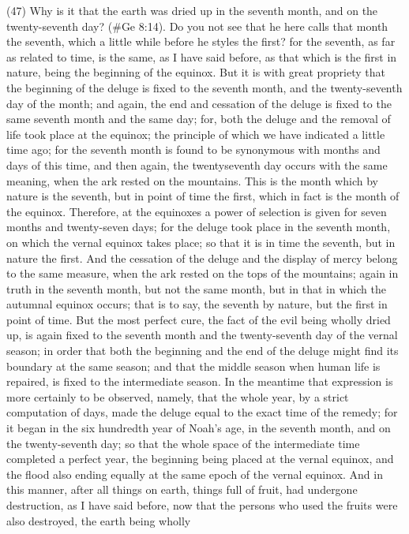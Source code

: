 (47) Why is it that the earth was dried up in the seventh month, and on the twenty-seventh day?
(\#Ge 8:14). Do you not see that he here calls that month the seventh, which a little while before
he styles the first? for the seventh, as far as related to time, is the same, as I have said before, as
that which is the first in nature, being the beginning of the equinox. But it is with great propriety that
the beginning of the deluge is fixed to the seventh month, and the twenty-seventh day of the month;
and again, the end and cessation of the deluge is fixed to the same seventh month and the same
day; for, both the deluge and the removal of life took place at the equinox; the principle of which we
have indicated a little time ago; for the seventh month is found to be synonymous with months and
days of this time, and then again, the twentyseventh day occurs with the same meaning, when the
ark rested on the mountains. This is the month which by nature is the seventh, but in point of time
the first, which in fact is the month of the equinox. Therefore, at the equinoxes a power of selection
is given for seven months and twenty-seven days; for the deluge took place in the seventh month,
on which the vernal equinox takes place; so that it is in time the seventh, but in nature the first. And
the cessation of the deluge and the display of mercy belong to the same measure, when the ark
rested on the tops of the mountains; again in truth in the seventh month, but not the same month,
but in that in which the autumnal equinox occurs; that is to say, the seventh by nature, but the first
in point of time. But the most perfect cure, the fact of the evil being wholly dried up, is again fixed to
the seventh month and the twenty-seventh day of the vernal season; in order that both the
beginning and the end of the deluge might find its boundary at the same season; and that the
middle season when human life is repaired, is fixed to the intermediate season. In the meantime
that expression is more certainly to be observed, namely, that the whole year, by a strict
computation of days, made the deluge equal to the exact time of the remedy; for it began in the six
hundredth year of Noah's age, in the seventh month, and on the twenty-seventh day; so that the
whole space of the intermediate time completed a perfect year, the beginning being placed at the
vernal equinox, and the flood also ending equally at the same epoch of the vernal equinox. And in
this manner, after all things on earth, things full of fruit, had undergone destruction, as I have said
before, now that the persons who used the fruits were also destroyed, the earth being wholly
